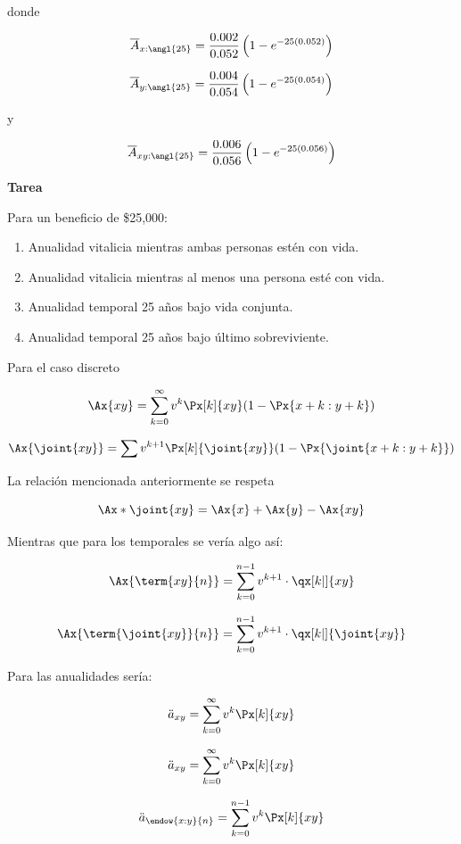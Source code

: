 \documentclass[12pt, a4paper, footinclude=true]{scrbook}
\begin{document}
	donde
	
	\[
	\overline{A}_{x:\angl{25}}
	=
	\frac{0.002}{0.052}
	\left(
	1 - e^{-25(0.052)}
	\right)
	\]
	
	\[
	\overline{A}_{y:\angl{25}}
	=
	\frac{0.004}{0.054}
	\left(
	1 - e^{-25(0.054)}
	\right)
	\]
	
	y
	
	\[
	\overline{A}_{xy:\angl{25}}
	=
	\frac{0.006}{0.056}
	\left(
	1 - e^{-25(0.056)}
	\right)
	\]
	
	\vspace{0.5cm}
	
	\textbf{Tarea}
	
	\vspace{0.2cm}
	
	Para un beneficio de \$25{,}000:
	
	\begin{enumerate}[label = \alph*)]
		\item Anualidad vitalicia mientras ambas personas estén con vida.
		\item Anualidad vitalicia mientras al menos una persona esté con vida.
		\item Anualidad temporal 25 años bajo vida conjunta.
		\item Anualidad temporal 25 años bajo último sobreviviente.
	\end{enumerate}
	
	Para el caso discreto
	
	\[
		\Ax{xy} = \sum_{k=0}^\infty v^k \Px[k]{xy}(1 - \Px{x+k:y+k})
	\]

	\[
		\Ax{\joint{xy}} = \sum v^{k+1} \Px[k]{\joint{xy}} (1 - \Px{\joint{x+k:y+k}})
	\]
	
	La relación mencionada anteriormente se respeta 
	
	\[
		\Ax*{\joint{xy}} = \Ax{x} + \Ax{y} - \Ax{xy}
	\]

	Mientras que para los temporales se vería algo así: 
	
	\[
		\Ax{\term{xy}{n}} = \sum_{k=0}^{n-1} v^{k+1} \cdot \qx[k|]{xy}
	\]

	\[
	\Ax{\term{\joint{xy}}{n}} = \sum_{k=0}^{n-1} v^{k+1} \cdot \qx[k|]{\joint{xy}}
	\]
	
	Para las anualidades sería: 
	
	\[
		\ddot{a}_{xy} = \sum_{k=0}^\infty v^k \Px[k]{xy}
	\]
	
	\[
	\ddot{a}_{xy} = \sum_{k=0}^\infty v^k \Px[k]{xy}
	\]
	
	\[
	\ddot{a}_{\endow{x:y}{n}} = \sum_{k=0}^{n-1} v^k \Px[k]{xy}
	\]
	
\end{document}

